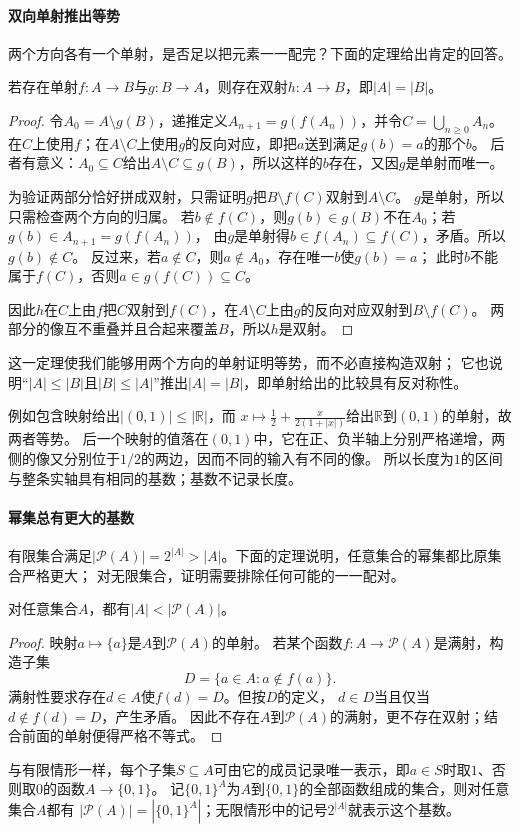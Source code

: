 \paragraph{双向单射推出等势}
两个方向各有一个单射，是否足以把元素一一配完？下面的定理给出肯定的回答。
\begin{theorem}
\label{thm:comb-cantor-schroeder-bernstein}
若存在单射$f:A\to B$与$g:B\to A$，则存在双射$h:A\to B$，即$|A|=|B|$。
\end{theorem}
\begin{proof}
令$A_0=A\setminus g(B)$，递推定义$A_{n+1}=g(f(A_n))$，并令$C=\bigcup_{n\geq0}A_n$。
在$C$上使用$f$；在$A\setminus C$上使用$g$的反向对应，即把$a$送到满足$g(b)=a$的那个$b$。
后者有意义：$A_0\subseteq C$给出$A\setminus C\subseteq g(B)$，所以这样的$b$存在，又因$g$是单射而唯一。

为验证两部分恰好拼成双射，只需证明$g$把$B\setminus f(C)$双射到$A\setminus C$。
$g$是单射，所以只需检查两个方向的归属。
若$b\notin f(C)$，则$g(b)\in g(B)$不在$A_0$；若$g(b)\in A_{n+1}=g(f(A_n))$，
由$g$是单射得$b\in f(A_n)\subseteq f(C)$，矛盾。所以$g(b)\notin C$。
反过来，若$a\notin C$，则$a\notin A_0$，存在唯一$b$使$g(b)=a$；
此时$b$不能属于$f(C)$，否则$a\in g(f(C))\subseteq C$。

因此$h$在$C$上由$f$把$C$双射到$f(C)$，在$A\setminus C$上由$g$的反向对应双射到$B\setminus f(C)$。
两部分的像互不重叠并且合起来覆盖$B$，所以$h$是双射。
\end{proof}
这一定理使我们能够用两个方向的单射证明等势，而不必直接构造双射；
它也说明“$|A|\leq|B|$且$|B|\leq|A|$”推出$|A|=|B|$，即单射给出的比较具有反对称性。

例如包含映射给出$|(0,1)|\leq|\mathbb R|$，而
$x\mapsto\tfrac12+\tfrac{x}{2(1+|x|)}$给出$\mathbb R$到$(0,1)$的单射，故两者等势。
后一个映射的值落在$(0,1)$中，它在正、负半轴上分别严格递增，两侧的像又分别位于$1/2$的两边，因而不同的输入有不同的像。
所以长度为$1$的区间与整条实轴具有相同的基数；基数不记录长度。

\paragraph{幂集总有更大的基数}
有限集合满足$|\mathcal P(A)|=2^{|A|}>|A|$。下面的定理说明，任意集合的幂集都比原集合严格更大；
对无限集合，证明需要排除任何可能的一一配对。
\begin{theorem}[Cantor定理]
\label{thm:comb-cantor-power-set}
对任意集合$A$，都有$|A|<|\mathcal P(A)|$。
\end{theorem}
\begin{proof}
映射$a\mapsto\{a\}$是$A$到$\mathcal P(A)$的单射。
若某个函数$f:A\to\mathcal P(A)$是满射，构造子集
\[
 D=\{a\in A:a\notin f(a)\}.
\]
满射性要求存在$d\in A$使$f(d)=D$。但按$D$的定义，
$d\in D$当且仅当$d\notin f(d)=D$，产生矛盾。
因此不存在$A$到$\mathcal P(A)$的满射，更不存在双射；结合前面的单射便得严格不等式。
\end{proof}
与有限情形一样，每个子集$S\subseteq A$可由它的成员记录唯一表示，即$a\in S$时取$1$、否则取$0$的函数$A\to\{0,1\}$。
记$\{0,1\}^{A}$为$A$到$\{0,1\}$的全部函数组成的集合，则对任意集合$A$都有
$|\mathcal P(A)|=|\{0,1\}^{A}|$；无限情形中的记号$2^{|A|}$就表示这个基数。

